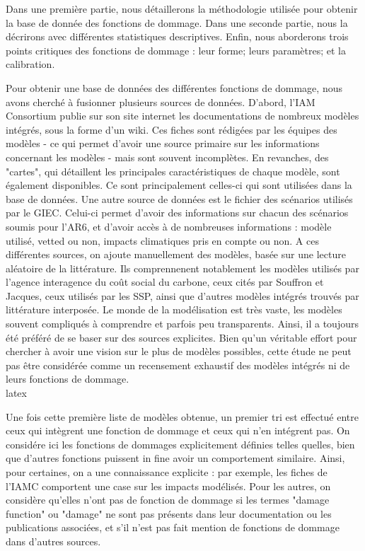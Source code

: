 Dans une première partie, nous détaillerons la méthodologie utilisée pour obtenir la base de donnée des fonctions de dommage. Dans une seconde partie, nous la décrirons avec différentes statistiques descriptives. Enfin, nous aborderons trois points critiques des fonctions de dommage : leur forme; leurs paramètres; et la calibration. 

\begin{methodbox}
Pour obtenir une base de données des différentes fonctions de dommage, nous avons cherché à fusionner plusieurs sources de données. D'abord, l'IAM Consortium publie sur son site internet les documentations de nombreux modèles intégrés, sous la forme d'un wiki. Ces fiches sont rédigées par les équipes des modèles - ce qui permet d'avoir une source primaire sur les informations concernant les modèles - mais sont souvent incomplètes. En revanches, des "cartes", qui détaillent les principales caractéristiques de chaque modèle, sont également disponibles. Ce sont principalement celles-ci qui sont utilisées dans la base de données. Une autre source de données est le fichier des scénarios utilisés par le GIEC. Celui-ci permet d'avoir des informations sur chacun des scénarios soumis pour l'AR6, et d'avoir accès à de nombreuses informations : modèle utilisé, vetted ou non, impacts climatiques pris en compte ou non. A ces différentes sources, on ajoute manuellement des modèles, basée sur une lecture aléatoire de la littérature. Ils comprennenent notablement les modèles utilisés par l'agence interagence du coût social du carbone, ceux cités par Souffron et Jacques, ceux utilisés par les SSP, ainsi que d'autres modèles intégrés trouvés par littérature interposée. 
Le monde de la modélisation est très vaste, les modèles souvent compliqués à comprendre et parfois peu transparents. Ainsi, il a toujours été préféré de se baser sur des sources explicites. Bien qu'un véritable effort pour chercher à avoir une vision sur le plus de modèles possibles, cette étude ne peut pas être considérée comme un recensement exhaustif des modèles intégrés ni de leurs fonctions de dommage. \\ \gls{latex}

Une fois cette première liste de modèles obtenue, un premier tri est effectué entre ceux qui intègrent une fonction de dommage et ceux qui n'en intégrent pas. On considére ici les fonctions de dommages explicitement définies telles quelles, bien que d'autres fonctions puissent in fine avoir un comportement similaire. Ainsi, pour certaines, on a une connaissance explicite : par exemple, les fiches de l'IAMC comportent une case sur les impacts modélisés. Pour les autres, on considère qu'elles n'ont pas de fonction de dommage si les termes "damage function" ou "damage" ne sont pas présents dans leur documentation ou les publications associées, et s'il n'est pas fait mention de fonctions de dommage dans d'autres sources. \\


\end{methodbox}
